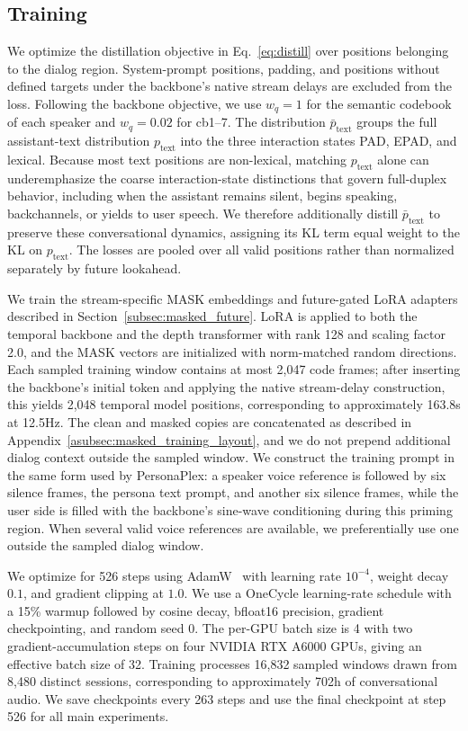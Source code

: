 \subsection{Training}
\label{asubsec:training}

We optimize the distillation objective in Eq.~\ref{eq:distill} over positions belonging to the dialog region.
System-prompt positions, padding, and positions without defined targets under the backbone's native stream delays are excluded from the loss.
Following the backbone objective, we use $w_q=1$ for the semantic codebook of each speaker and $w_q=0.02$ for cb1--7.
The distribution $\bar p_{\mathrm{text}}$ groups the full assistant-text distribution $p_{\mathrm{text}}$ into the three interaction states PAD, EPAD, and lexical.
Because most text positions are non-lexical, matching $p_{\mathrm{text}}$ alone can underemphasize the coarse interaction-state distinctions that govern full-duplex behavior, including when the assistant remains silent, begins speaking, backchannels, or yields to user speech.
We therefore additionally distill $\bar p_{\mathrm{text}}$ to preserve these conversational dynamics, assigning its KL term equal weight to the KL on $p_{\mathrm{text}}$.
The losses are pooled over all valid positions rather than normalized separately by future lookahead.

We train the stream-specific MASK embeddings and future-gated LoRA adapters described in Section~\ref{subsec:masked_future}.
LoRA is applied to both the temporal backbone and the depth transformer with rank 128 and scaling factor 2.0, and the MASK vectors are initialized with norm-matched random directions.
Each sampled training window contains at most 2,047 code frames; after inserting the backbone's initial token and applying the native stream-delay construction, this yields 2,048 temporal model positions, corresponding to approximately 163.8s at 12.5Hz.
The clean and masked copies are concatenated as described in Appendix~\ref{asubsec:masked_training_layout}, and we do not prepend additional dialog context outside the sampled window.
We construct the training prompt in the same form used by PersonaPlex: a speaker voice reference is followed by six silence frames, the persona text prompt, and another six silence frames, while the user side is filled with the backbone's sine-wave conditioning during this priming region.
When several valid voice references are available, we preferentially use one outside the sampled dialog window.

We optimize for 526 steps using AdamW~\citep{loshchilov2019decoupledweightdecayregularization} with learning rate $10^{-4}$, weight decay $0.1$, and gradient clipping at $1.0$.
We use a OneCycle learning-rate schedule with a 15\% warmup followed by cosine decay, bfloat16 precision, gradient checkpointing, and random seed 0.
The per-GPU batch size is 4 with two gradient-accumulation steps on four NVIDIA RTX A6000 GPUs, giving an effective batch size of 32.
Training processes 16,832 sampled windows drawn from 8,480 distinct sessions, corresponding to approximately 702h of conversational audio.
We save checkpoints every 263 steps and use the final checkpoint at step 526 for all main experiments.

